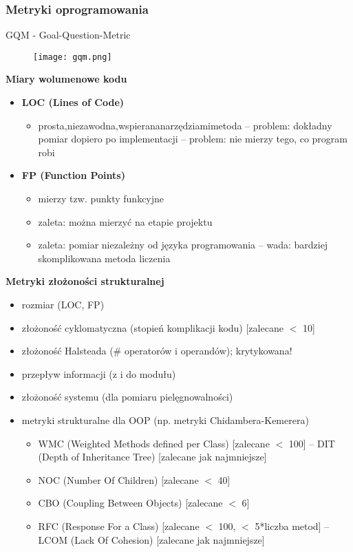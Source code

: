 \documentclass[../main.tex]{subfiles}
\begin{document}
    \subsubsection{Metryki oprogramowania}

    GQM - Goal-Question-Metric

    \begin{figure}[H]
        \texttt{[image: gqm.png]}
    \end{figure}

    \textbf{Miary wolumenowe kodu}
    \begin{itemize}
        \item \textbf{LOC (Lines of Code)}
        \begin{itemize}
            \item prosta,niezawodna,wspierananarzędziamimetoda – problem: dokładny pomiar dopiero po implementacji – problem: nie mierzy tego, co program robi
        \end{itemize}
        \item \textbf{FP (Function Points)}
        \begin{itemize}
            \item mierzy tzw. punkty funkcyjne
            \item zaleta: można mierzyć na etapie projektu
            \item zaleta: pomiar niezależny od języka programowania – wada: bardziej skomplikowana metoda liczenia
        \end{itemize}
    \end{itemize}

    \textbf{Metryki złożoności strukturalnej}
    \begin{itemize}
        \item rozmiar (LOC, FP)
        \item złożoność cyklomatyczna (stopień komplikacji kodu) [zalecane $<$ 10]
        \item złożoność Halsteada (\# operatorów i operandów); krytykowana!
        \item przepływ informacji (z i do modułu)
        \item złożoność systemu (dla pomiaru pielęgnowalności)
        \item metryki strukturalne dla OOP (np. metryki Chidambera-Kemerera)
        \begin{itemize}
            \item WMC (Weighted Methods defined per Class) [zalecane $<$ 100] – DIT (Depth of Inheritance Tree) [zalecane jak najmniejsze]
            \item NOC (Number Of Children) [zalecane $<$ 40]
            \item CBO (Coupling Between Objects) [zalecane $<$ 6]
            \item RFC (Response For a Class) [zalecane $<$ 100, $<$ 5*liczba metod] – LCOM (Lack Of Cohesion) [zalecane jak najmniejsze]
        \end{itemize}
    \end{itemize}
\end{document}
